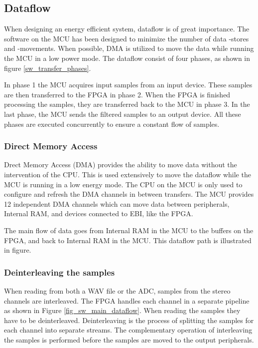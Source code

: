 
\subsection{Dataflow}
When designing an energy efficient system, dataflow is of great importance. The
software on the MCU has been designed to minimize the number of data -stores and
-movements. When possible, DMA is utilized to move the data while running the
MCU in a low power mode. The dataflow consist of four phases, as shown in figure
\ref{sw_transfer_phases}.

In phase 1 the MCU acquires input samples from an input device. These samples
are then transferred to the FPGA in phase 2. When the FPGA is finished
processing the samples, they are transferred back to the MCU in phase 3. In the
last phase, the MCU sends the filtered samples to an output device. All these
phases are executed concurrently to ensure a constant flow of samples.



\subsubsection{Direct Memory Access}
Drect Memory Access (DMA) provides the ability to move data
without the intervention of the CPU. This is used extensively to move the
dataflow while the MCU is running in a low energy mode. The CPU on the MCU is
only used to configure and refresh the DMA channels in between transfers. The
MCU provides 12 independent DMA channels which can move data between
peripherals, Internal RAM, and devices connected to EBI, like the FPGA.

The main flow of data goes from Internal RAM in the MCU to the buffers on
the FPGA, and back to Internal RAM in the MCU. This dataflow path is illustrated in figure.

% 

\subsubsection{Deinterleaving the samples}
When reading from both a WAV file or the ADC, samples from the stereo channels
are interleaved. The FPGA handles each channel in a separate pipeline as shown
in Figure \ref{fig_sw_main_dataflow}.
When reading the samples they have to be deinterleaved. Deinterleaving is the
process of splitting the samples for each channel into separate streams.
The complementary operation of interleaving the samples is performed before the samples
are moved to the output peripherals.

